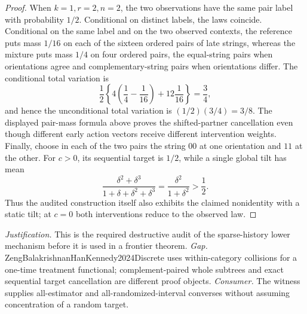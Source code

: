 \documentclass{article}
\begin{document}
\begin{proof}
When \(k=1,r=2,n=2\), the two observations have the same pair label with probability \(1/2\).  Conditional on distinct labels, the laws coincide.  Conditional on the same label and on the two observed contexts, the reference puts mass \(1/16\) on each of the sixteen ordered pairs of late strings, whereas the mixture puts mass \(1/4\) on four ordered pairs, the equal-string pairs when orientations agree and complementary-string pairs when orientations differ.  The conditional total variation is
\[
 \frac12\left\{4\left(\frac14-\frac1{16}\right)+12\frac1{16}\right\}=\frac34,
\]
and hence the unconditional total variation is \((1/2)(3/4)=3/8\).  The displayed pair-mass formula above proves the shifted-partner cancellation even though different early action vectors receive different intervention weights.  Finally, choose in each of the two pairs the string \(00\) at one orientation and \(11\) at the other.  For \(c>0\), its sequential target is \(1/2\), while a single global tilt has mean
\[
 \frac{\delta^2+\delta^3}{1+\delta+\delta^2+\delta^3}
 =\frac{\delta^2}{1+\delta^2}>\frac12.
\]
Thus the audited construction itself also exhibits the claimed nonidentity with a static tilt; at \(c=0\) both interventions reduce to the observed law.
\end{proof}
\par\smallskip\noindent \textit{Justification.} This is the required destructive audit of the sparse-history lower mechanism before it is used in a frontier theorem. \textit{Gap.} ZengBalakrishnanHanKennedy2024Discrete uses within-category collisions for a one-time treatment functional; complement-paired whole subtrees and exact sequential target cancellation are different proof objects. \textit{Consumer.} The witness supplies all-estimator and all-randomized-interval converses without assuming concentration of a random target.
\end{document}

